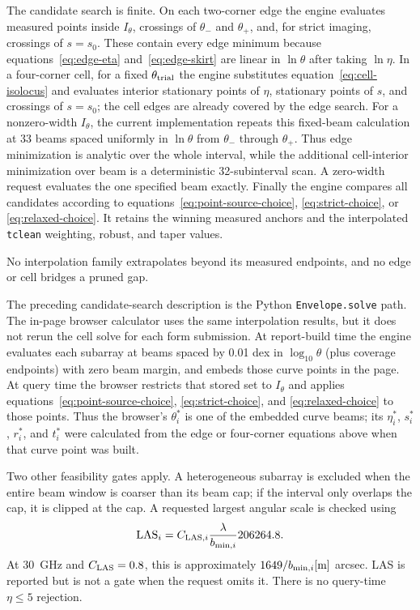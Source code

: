 \documentclass[11pt]{article}
\begin{document}
The candidate search is finite.  On each two-corner edge the engine evaluates
measured points inside $I_\theta$, crossings of $\theta_-$ and $\theta_+$,
and, for strict imaging, crossings of $s=s_0$.  These contain every edge
minimum because equations~\eqref{eq:edge-eta} and~\eqref{eq:edge-skirt} are
linear in $\ln\theta$ after taking $\ln\eta$.  In a four-corner cell, for a
fixed $\theta_{\rm trial}$ the engine substitutes equation~\eqref{eq:cell-isolocus} and
evaluates interior stationary points of $\eta$, stationary points of $s$, and
crossings of $s=s_0$; the cell edges are already covered by the edge search.
For a nonzero-width $I_\theta$, the current implementation repeats this
fixed-beam calculation at 33 beams spaced uniformly in $\ln\theta$ from
$\theta_-$ through $\theta_+$.  Thus edge minimization is analytic over the
whole interval, while the additional cell-interior minimization over beam is
a deterministic 32-subinterval scan.  A zero-width request evaluates the one
specified beam exactly.  Finally the engine compares all candidates according
to equations~\eqref{eq:point-source-choice}, \eqref{eq:strict-choice}, or
\eqref{eq:relaxed-choice}.  It retains the winning measured anchors and the
interpolated \texttt{tclean} weighting, robust, and taper values.

No interpolation family extrapolates beyond its measured endpoints, and no
edge or cell bridges a pruned gap.

The preceding candidate-search description is the Python
\texttt{Envelope.solve} path.  The in-page browser calculator uses the same
interpolation results, but it does not rerun the cell solve for each form
submission.  At report-build time the engine evaluates each subarray at
beams spaced by 0.01 dex in $\log_{10}\theta$ (plus coverage endpoints) with
zero beam margin, and embeds those curve points in the page.  At query time
the browser restricts that stored set to $I_\theta$ and applies
equations~\eqref{eq:point-source-choice}, \eqref{eq:strict-choice}, and
\eqref{eq:relaxed-choice} to those points.  Thus the browser's
$\theta_i^*$ is one of the embedded curve beams; its $\eta_i^*$, $s_i^*$,
$r_i^*$, and $t_i^*$ were calculated from the edge or four-corner equations
above when that curve point was built.

Two other feasibility gates apply.  A heterogeneous subarray is excluded when
the entire beam window is coarser than its beam cap; if the interval only
overlaps the cap, it is clipped at the cap.  A requested largest angular scale
is checked using
\begin{equation}
 {\rm LAS}_i=C_{{\rm LAS},i}\frac{\lambda}{b_{\min,i}}206264.8.
\end{equation}
At 30~GHz and $C_{\rm LAS}=0.8$, this is approximately
$1649/b_{\min,i}[{\rm m}]$ arcsec.  LAS is reported but is not a gate when the
request omits it.  There is no query-time $\eta\le5$ rejection.
\end{document}
